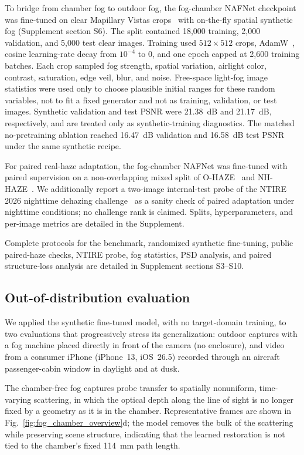 \documentclass{optica-article}
\begin{document}
To bridge from chamber fog to outdoor fog, the fog-chamber NAFNet
checkpoint was fine-tuned on clear Mapillary Vistas
crops~\cite{neuhold2017mapillary} with on-the-fly spatial synthetic
fog (Supplement section S6). The split contained 18{,}000 training,
2{,}000 validation, and 5{,}000 test clear images. Training used
$512\times512$ crops, AdamW~\cite{loshchilov2019adamw}, cosine
learning-rate decay from $10^{-4}$ to 0, and one epoch capped at
2{,}600 training batches. Each crop sampled fog strength, spatial
variation, airlight color, contrast, saturation, edge veil, blur,
and noise. Free-space light-fog image statistics were used only to
choose plausible initial ranges for these random variables, not to
fit a fixed generator and not as training, validation, or test
images. Synthetic validation and test PSNR were 21.38~dB and
21.17~dB, respectively, and are treated only as synthetic-training
diagnostics. The matched no-pretraining ablation reached
16.47~dB validation and 16.58~dB test PSNR under the same synthetic
recipe.

For paired real-haze adaptation, the fog-chamber NAFNet was
fine-tuned with paired supervision on a non-overlapping mixed split
of O-HAZE~\cite{ancuti2018ohaze} and NH-HAZE~\cite{ancuti2020nhhaze}.
We additionally report a two-image internal-test probe of the NTIRE
2026 nighttime dehazing
challenge~\cite{ancuti2026ntire,ancuti2026nt} as a sanity check
of paired adaptation under nighttime conditions; no challenge rank
is claimed. Splits, hyperparameters, and per-image metrics are
detailed in the Supplement.

Complete protocols for the benchmark, randomized synthetic fine-tuning, public
paired-haze checks, NTIRE probe, fog statistics, PSD analysis, and
paired structure-loss analysis are detailed in Supplement sections
S3--S10.
 
\subsection{Out-of-distribution evaluation}
\label{sec:ood}

We applied the synthetic fine-tuned model, with no target-domain
training, to two evaluations that progressively stress its
generalization: outdoor captures with a fog machine placed
directly in front of the camera (no enclosure), and video from a
consumer iPhone (iPhone~13, iOS~26.5) recorded through an aircraft
passenger-cabin window in daylight and at dusk.

The chamber-free fog captures probe transfer to spatially
nonuniform, time-varying scattering, in which the optical depth
along the line of sight is no longer fixed by a geometry as it is
in the chamber. Representative frames are shown in
Fig.~\ref{fig:fog_chamber_overview}d; the model removes the bulk of the
scattering while preserving scene structure, indicating that the
learned restoration is not tied to the chamber's fixed 114~mm
path length.
\end{document}

